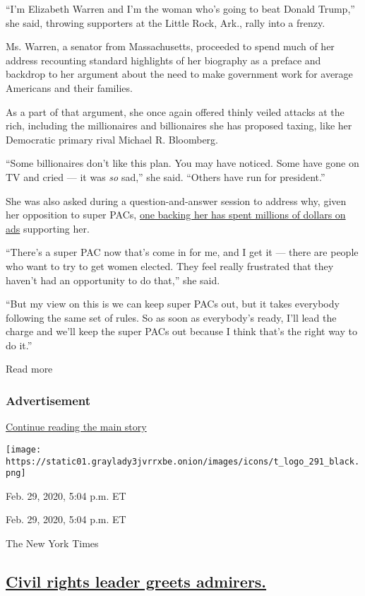 ``I'm Elizabeth Warren and I'm the woman who's going to beat Donald
Trump,'' she said, throwing supporters at the Little Rock, Ark., rally
into a frenzy.

Ms. Warren, a senator from Massachusetts, proceeded to spend much of her
address recounting standard highlights of her biography as a preface and
backdrop to her argument about the need to make government work for
average Americans and their families.

As a part of that argument, she once again offered thinly veiled attacks
at the rich, including the millionaires and billionaires she has
proposed taxing, like her Democratic primary rival Michael R. Bloomberg.

``Some billionaires don't like this plan. You may have noticed. Some
have gone on TV and cried --- it was \emph{so} sad,'' she said. ``Others
have run for president.''

She was also asked during a question-and-answer session to address why,
given her opposition to super PACs,
\href{https://www.nytimes3xbfgragh.onion/2020/02/27/us/politics/elizabeth-warren-super-pac.html}{one
backing her has spent millions of dollars on ads} supporting her.

``There's a super PAC now that's come in for me, and I get it --- there
are people who want to try to get women elected. They feel really
frustrated that they haven't had an opportunity to do that,'' she said.

``But my view on this is we can keep super PACs out, but it takes
everybody following the same set of rules. So as soon as everybody's
ready, I'll lead the charge and we'll keep the super PACs out because I
think that's the right way to do it.''

Read more

\hypertarget{advertisement-4}{%
\subsubsection{Advertisement}\label{advertisement-4}}

\protect\hyperlink{after-dfp-ad-mid5}{Continue reading the main story}

\texttt{[image: https://static01.graylady3jvrrxbe.onion/images/icons/t\_logo\_291\_black.png]}

Feb. 29, 2020, 5:04 p.m. ET

Feb. 29, 2020, 5:04 p.m. ET

The New York Times

\hypertarget{civil-rights-leader-greets-admirers}{%
\subsection{\texorpdfstring{\protect\hyperlink{civil-rights-leader-greets-admirers}{Civil
rights leader greets
admirers.}}{Civil rights leader greets admirers.}}\label{civil-rights-leader-greets-admirers}}

